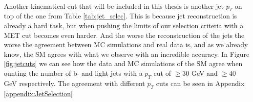 \documentclass[12pt, a4paper]{book}
\begin{document}
\\Another kinematical cut that will be included in this thesis is another jet $p_T$ on top of the one from Table \ref{tab:jet_selec}. This is because jet reconstruction is already a hard task, but when pushing the limits of our selection criteria with a MET cut 
becomes even harder. And the worse the reconstruction of the jets the worse the agreement between MC simulations and real data is, and as we already know, the SM agrees with what we observe with an incredible accuracy. In Figure \ref{fig:jetcuts} we can see 
how the data and MC simulations of the SM agree when ounting the number of b- and light jets with a $p_T$ cut of $\ge30$ GeV and $\ge40$ GeV respectively. The agreement with different $p_T$ cuts can be seen in Appendix \ref{appendix:JetSelection} \\
\graphicspath{{../../../Plots/Data_Analysis/JetSelection/Control_region/}} 
\end{document}
